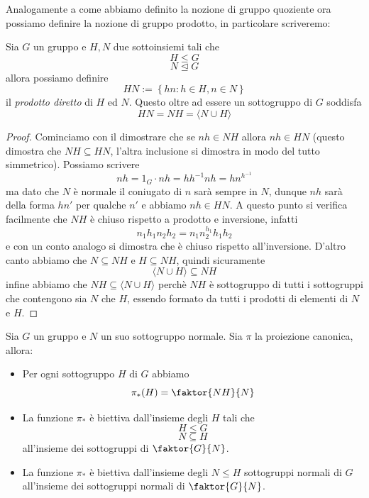 \documentclass[11pt]{scrartcl}
\newcommand{\normal}{\mathrel{\unlhd}}
\begin{document}
	Analogamente a come abbiamo definito la nozione di gruppo quoziente ora possiamo definire la nozione di gruppo prodotto, in particolare scriveremo:
	\begin{definition}
		Sia $G$ un gruppo e $H,N$ due sottoinsiemi tali che 
		$$H\le G$$
		$$N\normal G$$
		allora possiamo definire 
		$$HN:=\left\{hn:h\in H, n\in N\right\}$$
		il \textit{prodotto diretto} di $H$ ed $N$. Questo oltre ad essere un sottogruppo di $G$ soddisfa 
		$$HN=NH=\langle N \cup H\rangle$$
	\end{definition}
	\begin{proof}
		Cominciamo con il dimostrare che se $nh\in NH$ allora $nh\in HN$ (questo dimostra che $NH\subseteq HN$, l'altra inclusione si dimostra in modo del tutto simmetrico). Possiamo scrivere
		$$nh= 1_G\cdot nh=hh^{-1}nh=hn^{h^{-1}}$$
		ma dato che $N$ è normale il coniugato di $n$ sarà sempre in $N$, dunque $nh$ sarà della forma $hn'$ per qualche $n'$ e abbiamo $nh\in HN$. A questo punto si verifica facilmente che $NH$ è chiuso rispetto a prodotto e inversione, infatti
		$$n_1h_1n_2h_2=n_1n_2^{h_1}h_1h_2$$	
		e con un conto analogo si dimostra che è chiuso rispetto all'inversione. D'altro canto abbiamo che $N\subseteq NH$ e $H\subseteq NH$, quindi sicuramente
		$$\langle N \cup H \rangle \subseteq NH$$
		infine abbiamo che $NH\subseteq \langle N \cup H \rangle$ perchè $NH$ è sottogruppo di tutti i sottogruppi che contengono sia $N$ che $H$, essendo formato da tutti i prodotti di elementi di $N$ e $H$.
	\end{proof}
	\begin{theorem}[di Corrispondenza]
		Sia $G$ un gruppo e $N$ un suo sottogruppo normale. Sia $\pi$ la proiezione canonica, allora:
		\begin{itemize}
			\item Per ogni sottogruppo $H$ di $G$ abbiamo
			$$\pi_*(H)=\faktor{NH}{N}$$
			\item La funzione $\pi_*$ è biettiva dall'insieme degli $H$ tali che 
			$$H\le G$$
			$$N \subseteq H$$
			all'insieme dei sottogruppi di $\faktor{G}{N}$.
			\item La funzione $\pi_*$ è biettiva dall'insieme degli $N\le H$ sottogruppi normali di $G$ all'insieme dei sottogruppi normali di $\faktor{G}{N}$.
		\end{itemize}
	\end{theorem}
\end{document}
